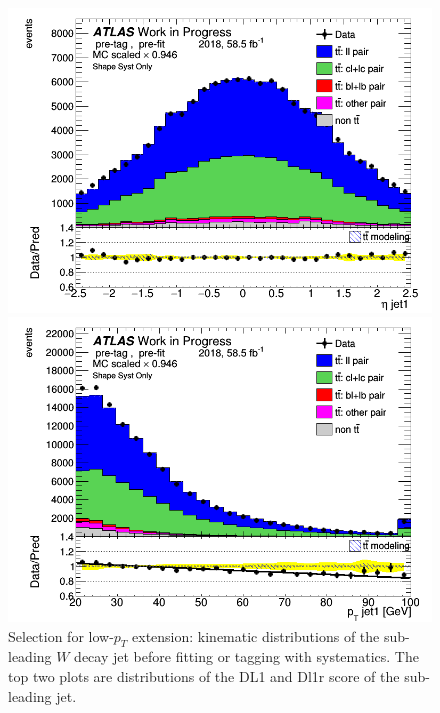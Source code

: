 \documentclass[letterpaper,12pt]{article}
\begin{document}
\begin{figure}[H]
\begin{minipage}[b]{.45\textwidth}
\includegraphics[width=1\textwidth]{Distribution_March/DataMC_J1_eta.png}
\end{minipage}\hfill
\begin{minipage}[b]{.45\textwidth}
\centering
\includegraphics[width=1\textwidth]{Distribution_March/DataMC_J1_pt.png}
\end{minipage}
\caption{Selection for low-$p_T$ extension: kinematic distributions of the 
sub-leading $W$ decay jet before fitting or tagging with systematics. 
The top two plots are distributions of the DL1 and Dl1r score of the 
sub-leading jet.} \label{fig:lowpT_selection}
\end{figure}
\end{document}
